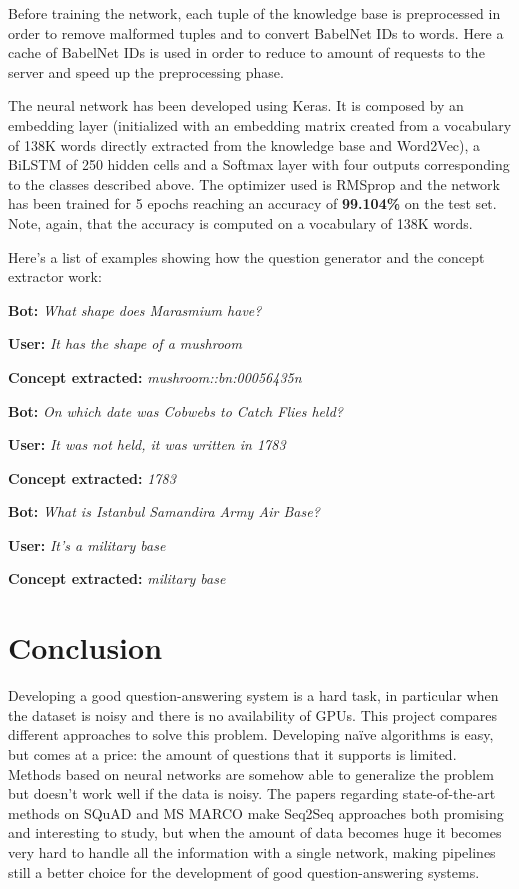 \documentclass[paper=a4, fontsize=11pt]{scrartcl} %
\numberwithin{equation}{section} %
\numberwithin{figure}{section} %
\numberwithin{table}{section} %
\theoremstyle{definition}
\begin{document}
Before training the network, each tuple of the knowledge base is
preprocessed in order to remove malformed tuples and to convert BabelNet IDs
to words. Here a cache of BabelNet IDs is used in order to reduce to amount of
requests to the server and speed up the preprocessing phase.

The neural network has been developed using Keras. It is composed by an
embedding layer (initialized with an embedding matrix created from a vocabulary
of 138K words directly extracted from the knowledge base and Word2Vec), a BiLSTM of 250
hidden cells and a Softmax layer with four outputs corresponding to the
classes described above. The optimizer used is RMSprop and the network has been
trained for 5 epochs reaching an accuracy of \textbf{99.104\%} on the test set.
Note, again, that the accuracy is computed on a vocabulary of 138K words.

Here's a list of examples showing how the question generator and the concept
extractor work:

\textbf{Bot:} \textit{What shape does Marasmium have?}

\textbf{User:} \textit{It has the shape of a mushroom}

\textbf{Concept extracted:} \textit{mushroom::bn:00056435n}

\textbf{Bot:} \textit{On which date was Cobwebs to Catch Flies held?}

\textbf{User:} \textit{It was not held, it was written in 1783}

\textbf{Concept extracted:} \textit{1783}

\textbf{Bot:} \textit{What is Istanbul Samandira Army Air Base?}

\textbf{User:} \textit{It's a military base}

\textbf{Concept extracted:} \textit{military base}


\section{Conclusion}

Developing a good question-answering system is a hard task, in particular when
the dataset is noisy and there is no availability of GPUs. This project compares
different approaches to solve this problem. Developing na\"ive algorithms
is easy, but comes at a price: the amount of questions that it supports is
limited. Methods based on neural networks are somehow able to generalize the
problem but doesn't work well if the data is noisy. The papers
regarding state-of-the-art methods on SQuAD and MS MARCO make Seq2Seq approaches
both promising and interesting to study, but when the amount of data becomes
huge it becomes very hard to handle all the information with a single network,
making pipelines still a better choice for the development of good
question-answering systems.
\end{document}
